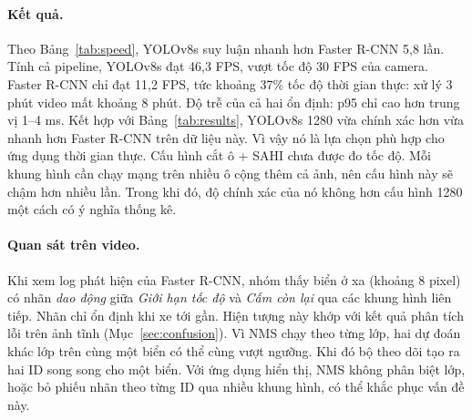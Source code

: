 \paragraph{Kết quả.}
Theo Bảng~\ref{tab:speed}, YOLOv8s suy luận nhanh hơn Faster R-CNN 5,8 lần.
Tính cả pipeline, YOLOv8s đạt 46,3 FPS, vượt tốc độ 30 FPS của camera. Faster R-CNN chỉ đạt 11,2 FPS, tức khoảng 37\% tốc độ thời gian thực: xử lý 3 phút video mất khoảng 8 phút.
Độ trễ của cả hai ổn định: p95 chỉ cao hơn trung vị 1--4 ms.
Kết hợp với Bảng~\ref{tab:results}, YOLOv8s 1280 vừa chính xác hơn vừa nhanh hơn Faster R-CNN trên dữ liệu này. Vì vậy nó là lựa chọn phù hợp cho ứng dụng thời gian thực.
Cấu hình cắt ô + SAHI chưa được đo tốc độ. Mỗi khung hình cần chạy mạng trên nhiều ô cộng thêm cả ảnh, nên cấu hình này sẽ chậm hơn nhiều lần. Trong khi đó, độ chính xác của nó không hơn cấu hình 1280 một cách có ý nghĩa thống kê.

\paragraph{Quan sát trên video.}
Khi xem log phát hiện của Faster R-CNN, nhóm thấy biển ở xa (khoảng 8 pixel) có nhãn \emph{dao động} giữa \textit{Giới hạn tốc độ} và \textit{Cấm còn lại} qua các khung hình liên tiếp. Nhãn chỉ ổn định khi xe tới gần.
Hiện tượng này khớp với kết quả phân tích lỗi trên ảnh tĩnh (Mục~\ref{sec:confusion}).
Vì NMS chạy theo từng lớp, hai dự đoán khác lớp trên cùng một biển có thể cùng vượt ngưỡng. Khi đó bộ theo dõi tạo ra hai ID song song cho một biển.
Với ứng dụng hiển thị, NMS không phân biệt lớp, hoặc bỏ phiếu nhãn theo từng ID qua nhiều khung hình, có thể khắc phục vấn đề này.
